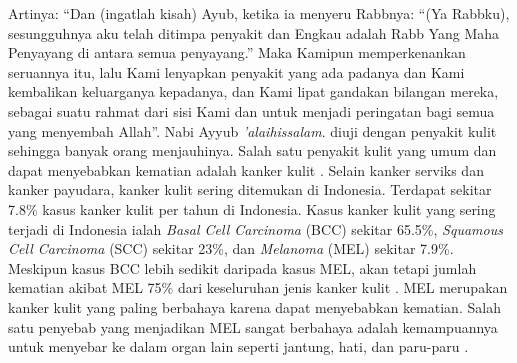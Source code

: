     Artinya: “Dan (ingatlah kisah) Ayub, ketika ia menyeru Rabbnya: “(Ya Rabbku), sesungguhnya aku telah ditimpa penyakit dan Engkau adalah Rabb Yang Maha Penyayang di antara semua penyayang.” Maka Kamipun memperkenankan seruannya itu, lalu Kami lenyapkan penyakit yang ada padanya dan Kami kembalikan keluarganya kepadanya, dan Kami lipat gandakan bilangan mereka, sebagai suatu rahmat dari sisi Kami dan untuk menjadi peringatan bagi semua yang menyembah Allah”. Nabi Ayyub \textit{'alaihissalam}. diuji dengan penyakit kulit sehingga banyak orang menjauhinya. Salah satu penyakit kulit yang umum dan dapat menyebabkan kematian adalah kanker kulit \citep{Nurlitasari2022}. Selain kanker serviks dan kanker payudara, kanker kulit sering ditemukan di Indonesia. Terdapat sekitar 7.8\% kasus kanker kulit per tahun di Indonesia. Kasus kanker kulit yang sering terjadi di Indonesia ialah \textit{Basal Cell Carcinoma} (BCC) sekitar 65.5\%, \textit{Squamous Cell Carcinoma} (SCC) sekitar 23\%, dan \textit{Melanoma} (MEL) sekitar 7.9\%. Meskipun kasus BCC lebih sedikit daripada kasus MEL, akan tetapi jumlah kematian akibat MEL 75\% dari keseluruhan jenis kanker kulit \citep{Fuadah2020a}. MEL merupakan kanker kulit yang paling berbahaya karena dapat menyebabkan kematian. Salah satu penyebab yang menjadikan MEL sangat berbahaya adalah kemampuannya untuk menyebar ke dalam organ lain seperti jantung, hati, dan paru-paru \citep{Nugroho2019}.
    
